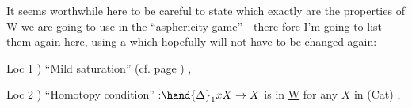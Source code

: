 It seems worthwhile here to be careful to state which exactly are
the properties of \underline{W} we are going to use in the ``asphericity game'' - there%
fore I'm going to list them again here,  using a 
 which\hand{,} hopefully\hand{,} will not have to be changed again:

Loc 1 ) ``Mild saturation'' (cf. page ) ,

Loc 2 ) ``Homotopy condition'' :$\hand{\Delta}_1 x X \rightarrow X$ is in \underline{W} for any $X$ in (Cat) ,

